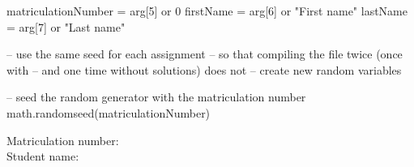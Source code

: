 \documentclass[a4paper]{exam}
\begin{document}
\begin{luacode*}
matriculationNumber = arg[5] or 0
firstName = arg[6] or "First name"
lastName = arg[7] or "Last name"

-- use the same seed for each assignment
-- so that compiling the file twice (once with
-- and one time without solutions) does not
-- create new random variables

-- seed the random generator with the matriculation number
math.randomseed(matriculationNumber)
\end{luacode*}

\noindent
Matriculation number: \\
Student name: 

\begin{questions}





\end{questions}
\end{document}
